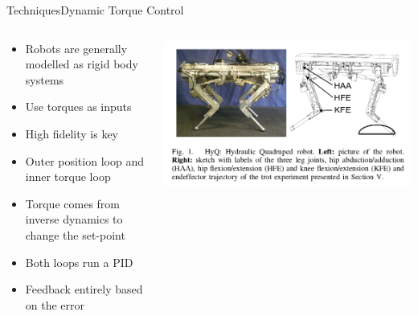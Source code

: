 \documentclass{beamer}
\begin{document}
\begin{frame}{Techniques}{Dynamic Torque Control\cite{6224628}}
\begin{columns}
    \begin{column}{0.47\textwidth}
		\begin{itemize}
			\item Robots are generally modelled as rigid body systems
			\item Use torques as inputs
			\item High fidelity is key
			\item Outer position loop and inner torque loop
			\item Torque comes from inverse dynamics to change the set-point
			\item Both loops run a PID
			\item Feedback entirely based on the error
		\end{itemize}
    \end{column}
    \begin{column}{0.5\textwidth}
        \includegraphics[scale=.2]{./images/quad_robot.png}
    \end{column}
\end{columns}
\end{frame}
\end{document}
